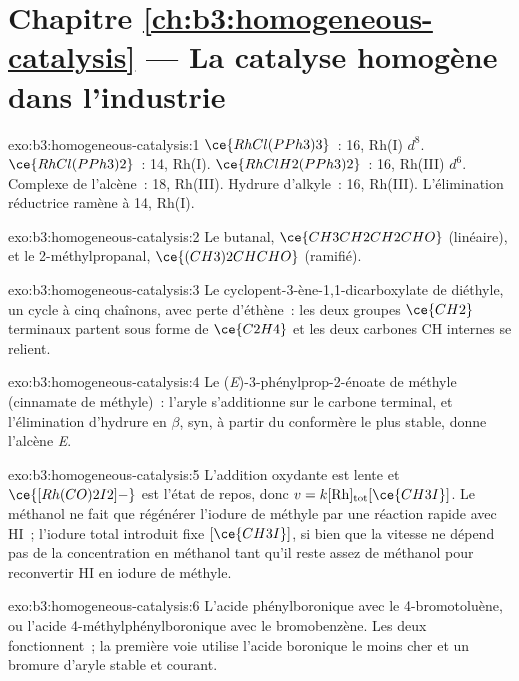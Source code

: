 \section*{Chapitre \ref{ch:b3:homogeneous-catalysis} --- La catalyse homogène dans l'industrie}

\begin{solution}{exo:b3:homogeneous-catalysis:1}
$\ce{RhCl(PPh3)3}$~: 16, Rh(I) $d^8$. $\ce{RhCl(PPh3)2}$~: 14, Rh(I). $\ce{RhClH2(PPh3)2}$~: 16, Rh(III) $d^6$.
Complexe de l'alcène~: 18, Rh(III). Hydrure d'alkyle~: 16, Rh(III).
L'élimination réductrice ramène à 14, Rh(I).
\end{solution}

\begin{solution}{exo:b3:homogeneous-catalysis:2}
Le butanal, $\ce{CH3CH2CH2CHO}$ (linéaire), et le 2-méthylpropanal, $\ce{(CH3)2CHCHO}$ (ramifié).
\end{solution}

\begin{solution}{exo:b3:homogeneous-catalysis:3}
Le cyclopent-3-ène-1,1-dicarboxylate de diéthyle, un cycle à cinq chaînons,
avec perte d'éthène~: les deux groupes $\ce{CH2}$ terminaux partent sous forme de $\ce{C2H4}$ et les deux carbones CH
internes se relient.
\end{solution}

\begin{solution}{exo:b3:homogeneous-catalysis:4}
Le (\textit{E})-3-phénylprop-2-énoate de méthyle (cinnamate de méthyle)~:
l'aryle s'additionne sur le carbone terminal, et l'élimination d'hydrure en $\beta$, syn, à partir du conformère le plus stable,
donne l'alcène \textit{E}.
\end{solution}

\begin{solution}{exo:b3:homogeneous-catalysis:5}
L'addition oxydante est lente et $\ce{[Rh(CO)2I2]-}$ est l'état de repos, donc
$v = k[\mathrm{Rh}]_{\mathrm{tot}}[\ce{CH3I}]$. Le méthanol ne fait que régénérer l'iodure de méthyle par une réaction rapide avec HI~;
l'iodure total introduit fixe $[\ce{CH3I}]$, si bien que la vitesse ne dépend pas de la
concentration en méthanol tant qu'il reste assez de méthanol pour
reconvertir HI en iodure de méthyle.
\end{solution}

\begin{solution}{exo:b3:homogeneous-catalysis:6}
L'acide phénylboronique avec le 4-bromotoluène, ou l'acide
4-méthylphénylboronique avec le bromobenzène. Les deux fonctionnent~; la
première voie utilise l'acide boronique le moins cher et un bromure d'aryle
stable et courant.
\end{solution}

